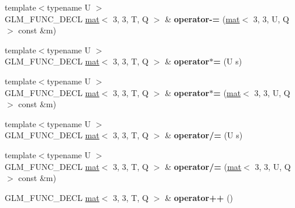 \begin{DoxyCompactItemize}
{\footnotesize template$<$typename U $>$ }\\G\+L\+M\+\_\+\+F\+U\+N\+C\+\_\+\+D\+E\+CL \hyperlink{structglm_1_1mat}{mat}$<$ 3, 3, T, Q $>$ \& {\bfseries operator-\/=} (\hyperlink{structglm_1_1mat}{mat}$<$ 3, 3, U, Q $>$ const \&m)
\item 
\mbox{\label{structglm_1_1mat_3_013_00_013_00_01T_00_01Q_01_4_af0528228c4f85b75447e923cebd99c2c}} 
{\footnotesize template$<$typename U $>$ }\\G\+L\+M\+\_\+\+F\+U\+N\+C\+\_\+\+D\+E\+CL \hyperlink{structglm_1_1mat}{mat}$<$ 3, 3, T, Q $>$ \& {\bfseries operator$\ast$=} (U s)
\item 
\mbox{\label{structglm_1_1mat_3_013_00_013_00_01T_00_01Q_01_4_adf6080b0295fc39579a981adc573dd66}} 
{\footnotesize template$<$typename U $>$ }\\G\+L\+M\+\_\+\+F\+U\+N\+C\+\_\+\+D\+E\+CL \hyperlink{structglm_1_1mat}{mat}$<$ 3, 3, T, Q $>$ \& {\bfseries operator$\ast$=} (\hyperlink{structglm_1_1mat}{mat}$<$ 3, 3, U, Q $>$ const \&m)
\item 
\mbox{\label{structglm_1_1mat_3_013_00_013_00_01T_00_01Q_01_4_a479948bc42b53782519ebebf64ff44a3}} 
{\footnotesize template$<$typename U $>$ }\\G\+L\+M\+\_\+\+F\+U\+N\+C\+\_\+\+D\+E\+CL \hyperlink{structglm_1_1mat}{mat}$<$ 3, 3, T, Q $>$ \& {\bfseries operator/=} (U s)
\item 
\mbox{\label{structglm_1_1mat_3_013_00_013_00_01T_00_01Q_01_4_a1ba66548bf8173db17de0de94807d918}} 
{\footnotesize template$<$typename U $>$ }\\G\+L\+M\+\_\+\+F\+U\+N\+C\+\_\+\+D\+E\+CL \hyperlink{structglm_1_1mat}{mat}$<$ 3, 3, T, Q $>$ \& {\bfseries operator/=} (\hyperlink{structglm_1_1mat}{mat}$<$ 3, 3, U, Q $>$ const \&m)
\item 
\mbox{\label{structglm_1_1mat_3_013_00_013_00_01T_00_01Q_01_4_ab04f2425cf74fb2edd7fdef18e9c2201}} 
G\+L\+M\+\_\+\+F\+U\+N\+C\+\_\+\+D\+E\+CL \hyperlink{structglm_1_1mat}{mat}$<$ 3, 3, T, Q $>$ \& {\bfseries operator++} ()
\item 

\end{DoxyCompactItemize}

